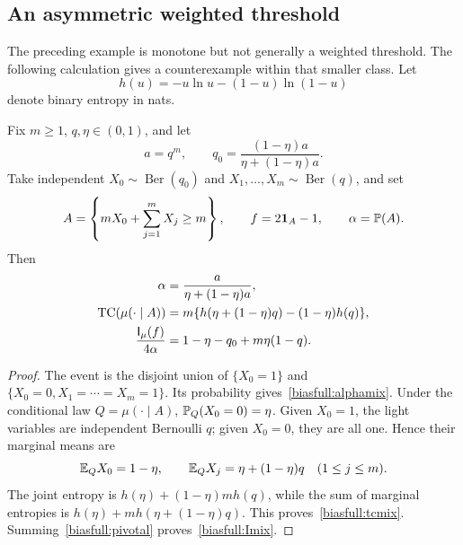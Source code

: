 \subsection{An asymmetric weighted threshold}

The preceding example is monotone but not generally a weighted threshold.
The following calculation gives a counterexample within that smaller class.
Let
\[
 h(u)=-u\ln u-(1-u)\ln(1-u)
\]
denote binary entropy in nats.

\begin{lemma}\label{biasfull:mixture}
Fix \(m\ge1\), \(q,\eta\in(0,1)\), and let
\[
 a=q^m,\qquad
 q_0=\frac{(1-\eta)a}{\eta+(1-\eta)a}.
\]
Take independent \(X_0\sim\operatorname{Ber}(q_0)\) and
\(X_1,\ldots,X_m\sim\operatorname{Ber}(q)\), and set
\[
 A=\left\{mX_0+\sum_{j=1}^mX_j\ge m\right\},
 \qquad f=2\mathbf1_A-1,\qquad \alpha=\P(A).
\]
Then
\begin{align}
 \alpha&=\frac{a}{\eta+(1-\eta)a},\label{biasfull:alphamix}\\
 \TC(\mu(\cdot\mid A))
   &=m\{h(\eta+(1-\eta)q)-(1-\eta)h(q)\},
       \label{biasfull:tcmix}\\
 \frac{\I_\mu(f)}{4\alpha}
   &=1-\eta-q_0+m\eta(1-q).
       \label{biasfull:Imix}
\end{align}
\end{lemma}
\begin{proof}
The event is the disjoint union of \(\{X_0=1\}\) and
\(\{X_0=0,X_1=\cdots=X_m=1\}\).
Its probability gives~\eqref{biasfull:alphamix}.
Under the conditional law \(Q=\mu(\cdot\mid A)\),
\(\P_Q(X_0=0)=\eta\). Given \(X_0=1\), the light variables are
independent Bernoulli \(q\); given \(X_0=0\), they are all one.
Hence their marginal means are
\[
 \E_QX_0=1-\eta,\qquad
 \E_QX_j=\eta+(1-\eta)q\quad(1\le j\le m).
\]
The joint entropy is \(h(\eta)+(1-\eta)mh(q)\), while the sum of
marginal entropies is \(h(\eta)+mh(\eta+(1-\eta)q)\).
This proves~\eqref{biasfull:tcmix}.
Summing~\eqref{biasfull:pivotal} proves~\eqref{biasfull:Imix}.
\end{proof}

